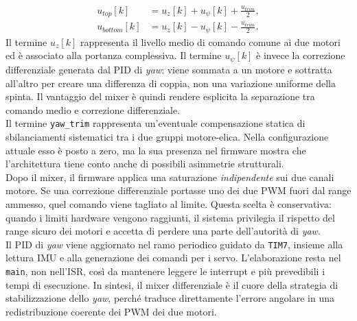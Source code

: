 \documentclass[11pt]{report}
\begin{document}
	\begin{align}
		u_{top}[k] &= u_z[k] + u_{\psi}[k] + \frac{u_{trim}}{2}, \\
		u_{bottom}[k] &= u_z[k] - u_{\psi}[k] - \frac{u_{trim}}{2}.
	\end{align}
	Il termine $u_z[k]$ rappresenta il livello medio di comando comune ai due motori ed è associato alla portanza complessiva. Il termine $u_{\psi}[k]$ è invece la correzione differenziale generata dal PID di \textit{yaw}: viene sommata a un motore e sottratta all'altro per creare una differenza di coppia, non una variazione uniforme della spinta. Il vantaggio del mixer è quindi rendere esplicita la separazione tra comando medio e correzione differenziale.\\
	Il termine \texttt{yaw\_trim} rappresenta un'eventuale compensazione statica di sbilanciamenti sistematici tra i due gruppi motore-elica. Nella configurazione attuale esso è posto a zero, ma la sua presenza nel firmware mostra che l'architettura tiene conto anche di possibili asimmetrie strutturali.\\
	Dopo il mixer, il firmware applica una saturazione \emph{indipendente} sui due canali motore. Se una correzione differenziale portasse uno dei due PWM fuori dal range ammesso, quel comando viene tagliato al limite. Questa scelta è conservativa: quando i limiti hardware vengono raggiunti, il sistema privilegia il rispetto del range sicuro dei motori e accetta di perdere una parte dell'autorità di \textit{yaw}.\\
	Il PID di \textit{yaw} viene aggiornato nel ramo periodico guidato da \texttt{TIM7}, insieme alla lettura IMU e alla generazione dei comandi per i servo. L'elaborazione resta nel \texttt{main}, non nell'ISR, così da mantenere leggere le interrupt e più prevedibili i tempi di esecuzione. In sintesi, il mixer differenziale è il cuore della strategia di stabilizzazione dello \textit{yaw}, perché traduce direttamente l'errore angolare in una redistribuzione coerente dei PWM dei due motori.
	
	
	
	
\end{document}
